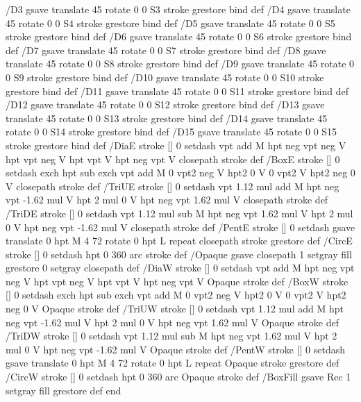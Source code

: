 {{/D3 { gsave translate 45 rotate 0 0 S3 stroke grestore } bind def
/D4 { gsave translate 45 rotate 0 0 S4 stroke grestore } bind def
/D5 { gsave translate 45 rotate 0 0 S5 stroke grestore } bind def
/D6 { gsave translate 45 rotate 0 0 S6 stroke grestore } bind def
/D7 { gsave translate 45 rotate 0 0 S7 stroke grestore } bind def
/D8 { gsave translate 45 rotate 0 0 S8 stroke grestore } bind def
/D9 { gsave translate 45 rotate 0 0 S9 stroke grestore } bind def
/D10 { gsave translate 45 rotate 0 0 S10 stroke grestore } bind def
/D11 { gsave translate 45 rotate 0 0 S11 stroke grestore } bind def
/D12 { gsave translate 45 rotate 0 0 S12 stroke grestore } bind def
/D13 { gsave translate 45 rotate 0 0 S13 stroke grestore } bind def
/D14 { gsave translate 45 rotate 0 0 S14 stroke grestore } bind def
/D15 { gsave translate 45 rotate 0 0 S15 stroke grestore } bind def
/DiaE { stroke [] 0 setdash vpt add M
  hpt neg vpt neg V hpt vpt neg V
  hpt vpt V hpt neg vpt V closepath stroke } def
/BoxE { stroke [] 0 setdash exch hpt sub exch vpt add M
  0 vpt2 neg V hpt2 0 V 0 vpt2 V
  hpt2 neg 0 V closepath stroke } def
/TriUE { stroke [] 0 setdash vpt 1.12 mul add M
  hpt neg vpt -1.62 mul V
  hpt 2 mul 0 V
  hpt neg vpt 1.62 mul V closepath stroke } def
/TriDE { stroke [] 0 setdash vpt 1.12 mul sub M
  hpt neg vpt 1.62 mul V
  hpt 2 mul 0 V
  hpt neg vpt -1.62 mul V closepath stroke } def
/PentE { stroke [] 0 setdash gsave
  translate 0 hpt M 4 {72 rotate 0 hpt L} repeat
  closepath stroke grestore } def
/CircE { stroke [] 0 setdash 
  hpt 0 360 arc stroke } def
/Opaque { gsave closepath 1 setgray fill grestore 0 setgray closepath } def
/DiaW { stroke [] 0 setdash vpt add M
  hpt neg vpt neg V hpt vpt neg V
  hpt vpt V hpt neg vpt V Opaque stroke } def
/BoxW { stroke [] 0 setdash exch hpt sub exch vpt add M
  0 vpt2 neg V hpt2 0 V 0 vpt2 V
  hpt2 neg 0 V Opaque stroke } def
/TriUW { stroke [] 0 setdash vpt 1.12 mul add M
  hpt neg vpt -1.62 mul V
  hpt 2 mul 0 V
  hpt neg vpt 1.62 mul V Opaque stroke } def
/TriDW { stroke [] 0 setdash vpt 1.12 mul sub M
  hpt neg vpt 1.62 mul V
  hpt 2 mul 0 V
  hpt neg vpt -1.62 mul V Opaque stroke } def
/PentW { stroke [] 0 setdash gsave
  translate 0 hpt M 4 {72 rotate 0 hpt L} repeat
  Opaque stroke grestore } def
/CircW { stroke [] 0 setdash 
  hpt 0 360 arc Opaque stroke } def
/BoxFill { gsave Rec 1 setgray fill grestore } def
end
}}%
